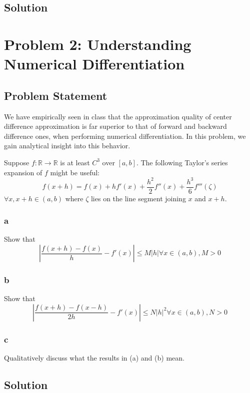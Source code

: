 \documentclass[11pt]{report}
\theoremstyle{definition}
\begin{document}
\subsection*{Solution}


\newpage
\section*{Problem 2: Understanding Numerical Differentiation}
\subsection*{Problem Statement}
We have empirically seen in class that the approximation quality of center
difference approximation is far superior to that of forward and backward
difference ones, when performing numerical differentiation. In this problem, we
gain analytical insight into this behavior.

Suppose $f : \mathbb{R}\rightarrow\mathbb{R}$ is at least $C^3$ over $[a,b]$. The following
Taylor's series expansion of $f$ might be useful:
\[
	f(x+h) = f(x) + hf'(x) + \frac{h^2}{2}f''(x)+\frac{h^3}{6}f'''(\zeta)
\]
$\forall x, x+h\in(a,b)$ where $\zeta$ lies on the line segment joining $x$ and $x+h$.

\subsubsection*{a}
Show that
\[
	\left|
	\frac{f(x+h)-f(x)}{h}-f'(x)
	\right|
	\leq M|h|
	\forall x\in(a,b), M>0
\]

\subsubsection*{b}
Show that
\[
	\left|
	\frac{f(x+h)-f(x-h)}{2h}-f'(x)
	\right|
	\leq N|h|^2
	\forall x\in(a,b), N>0
\]
\subsubsection*{c}
Qualitatively discuss what the results in (a) and (b) mean.

\subsection*{Solution}
\end{document}
